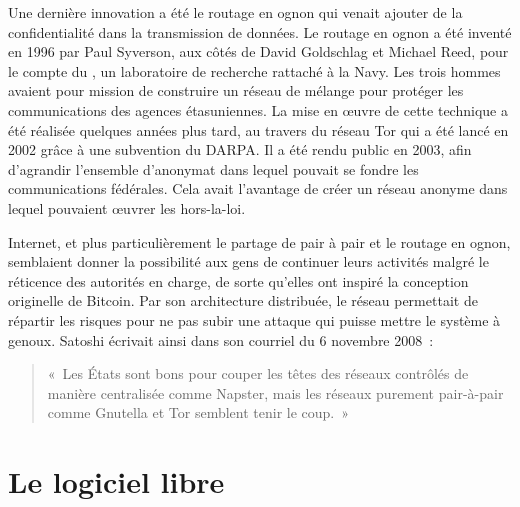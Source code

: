 Une dernière innovation a été le routage en ognon qui venait ajouter de la confidentialité dans la transmission de données. Le routage en ognon a été inventé en 1996 par Paul Syverson, aux côtés de David Goldschlag et Michael Reed, pour le compte du , un laboratoire de recherche rattaché à la Navy. Les trois hommes avaient pour mission de construire un réseau de mélange pour protéger les communications des agences étasuniennes. La mise en œuvre de cette technique a été réalisée quelques années plus tard, au travers du réseau Tor qui a été lancé en 2002 grâce à une subvention du DARPA. Il a été rendu public en 2003, afin d'agrandir l'ensemble d'anonymat dans lequel pouvait se fondre les communications fédérales. Cela avait l'avantage de créer un réseau anonyme dans lequel pouvaient œuvrer les hors-la-loi.

Internet, et plus particulièrement le partage de pair à pair et le routage en ognon, semblaient donner la possibilité aux gens de continuer leurs activités malgré le réticence des autorités en charge, de sorte qu'elles ont inspiré la conception originelle de Bitcoin. Par son architecture distribuée, le réseau permettait de répartir les risques pour ne pas subir une attaque qui puisse mettre le système à genoux. Satoshi écrivait ainsi dans son courriel du 6 novembre 2008~:

\begin{quote}
«~Les États sont bons pour couper les têtes des réseaux contrôlés de manière centralisée comme Napster, mais les réseaux purement pair-à-pair comme Gnutella et Tor semblent tenir le coup.~»
\end{quote} %


\section*{Le logiciel libre} %

